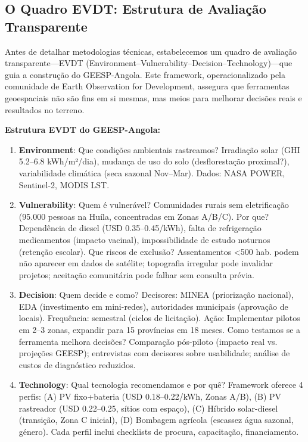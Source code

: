 \documentclass[12pt, a4paper]{article}
\begin{document}
\subsection{O Quadro EVDT: Estrutura de Avaliação Transparente}

Antes de detalhar metodologias técnicas, estabelecemos um quadro de avaliação transparente—EVDT (Environment–Vulnerability–Decision–Technology)—que guia a construção do GEESP-Angola. Este framework, operacionalizado pela comunidade de Earth Observation for Development, assegura que ferramentas geoespaciais não são fins em si mesmas, mas meios para melhorar decisões reais e resultados no terreno.

\textbf{Estrutura EVDT do GEESP-Angola:}

\begin{enumerate}
\item \textbf{Environment}: Que condições ambientais rastreamos? Irradiação solar (GHI 5.2--6.8 kWh/m²/dia), mudança de uso do solo (desflorestação proximal?), variabilidade climática (seca sazonal Nov--Mar). Dados: NASA POWER, Sentinel-2, MODIS LST.

\item \textbf{Vulnerability}: Quem é vulnerável? Comunidades rurais sem eletrificação (95.000 pessoas na Huíla, concentradas em Zonas A/B/C). Por que? Dependência de diesel (USD 0.35--0.45/kWh), falta de refrigeração medicamentos (impacto vacinal), impossibilidade de estudo noturnos (retenção escolar). Que riscos de exclusão? Assentamentos <500 hab. podem não aparecer em dados de satélite; topografia irregular pode invalidar projetos; aceitação comunitária pode falhar sem consulta prévia.

\item \textbf{Decision}: Quem decide e como? Decisores: MINEA (priorização nacional), EDA (investimento em mini-redes), autoridades municipais (aprovação de locais). Frequência: semestral (ciclos de licitação). Ação: Implementar pilotos em 2--3 zonas, expandir para 15 províncias em 18 meses. Como testamos se a ferramenta melhora decisões? Comparação pós-piloto (impacto real vs. projeções GEESP); entrevistas com decisores sobre usabilidade; análise de custos de diagnóstico reduzidos.

\item \textbf{Technology}: Qual tecnologia recomendamos e por quê? Framework oferece 4 perfis: (A) PV fixo+bateria (USD 0.18--0.22/kWh, Zonas A/B), (B) PV rastreador (USD 0.22--0.25, sítios com espaço), (C) Híbrido solar-diesel (transição, Zona C inicial), (D) Bombagem agrícola (escassez água sazonal, género). Cada perfil inclui checklists de procura, capacitação, financiamento.
\end{enumerate}
\end{document}
